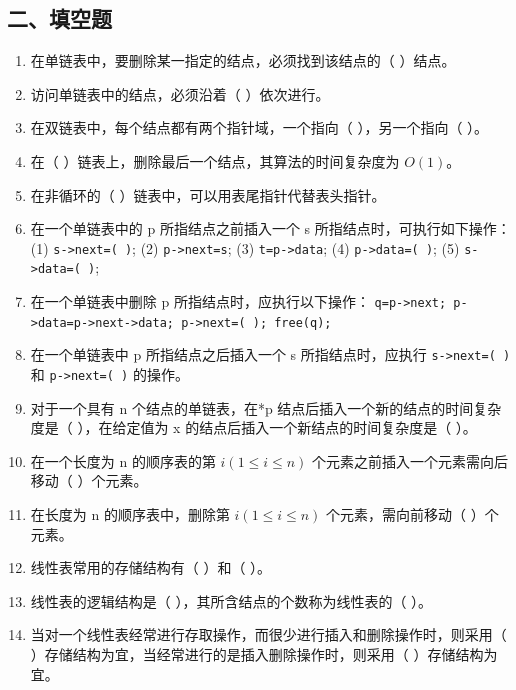 \documentclass[12pt, a4paper]{article}
\begin{document}
\subsection*{二、填空题}
\begin{enumerate}
    \item 在单链表中，要删除某一指定的结点，必须找到该结点的（ ）结点。
    \item 访问单链表中的结点，必须沿着（ ）依次进行。
    \item 在双链表中，每个结点都有两个指针域，一个指向（ ），另一个指向（ ）。
    \item 在（ ）链表上，删除最后一个结点，其算法的时间复杂度为 $O(1)$。
    \item 在非循环的（ ）链表中，可以用表尾指针代替表头指针。
    \item 在一个单链表中的 p 所指结点之前插入一个 s 所指结点时，可执行如下操作：
    (1) \texttt{s->next=( )}; (2) \texttt{p->next=s}; (3) \texttt{t=p->data}; (4) \texttt{p->data=( )}; (5) \texttt{s->data=( )};
    \item 在一个单链表中删除 p 所指结点时，应执行以下操作：
    \texttt{q=p->next; p->data=p->next->data; p->next=( ); free(q);}
    \item 在一个单链表中 p 所指结点之后插入一个 s 所指结点时，应执行 \texttt{s->next=( )} 和 \texttt{p->next=( )} 的操作。
    \item 对于一个具有 n 个结点的单链表，在*p 结点后插入一个新的结点的时间复杂度是（ ），在给定值为 x 的结点后插入一个新结点的时间复杂度是（ ）。
    \item 在一个长度为 n 的顺序表的第 $i (1 \le i \le n)$ 个元素之前插入一个元素需向后移动（ ）个元素。
    \item 在长度为 n 的顺序表中，删除第 $i (1 \le i \le n)$ 个元素，需向前移动（ ）个元素。
    \item 线性表常用的存储结构有（ ）和（ ）。
    \item 线性表的逻辑结构是（ ），其所含结点的个数称为线性表的（ ）。
    \item 当对一个线性表经常进行存取操作，而很少进行插入和删除操作时，则采用（ ）存储结构为宜，当经常进行的是插入删除操作时，则采用（ ）存储结构为宜。
\end{enumerate}
\end{document}
